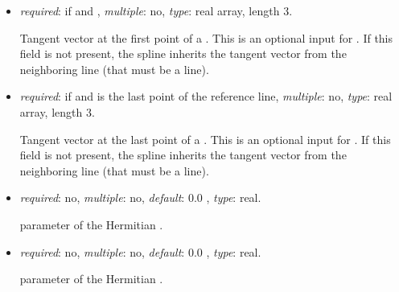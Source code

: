 \begin{itemize}
\item {} \textit{required}: if  
and , \textit{multiple}: no, 
\textit{type}: real array, length 3. 

    Tangent vector at the first point of a . 
    This is an optional input for . If this field 
    is not present, the spline inherits the tangent vector from the 
    neighboring line (that must be a  line).

\item {} \textit{required}: if  
and  is the last point of the reference line, 
\textit{multiple}: no, \textit{type}: real array, length 3. 

    Tangent vector at the last point of a . 
    This is an optional input for . If this field is 
    not present, the spline inherits the tangent vector from the 
    neighboring line (that must be a  line).

\item {} \textit{required}: no, \textit{multiple}: no, 
\textit{default}: 0.0 , \textit{type}: real.

     parameter of the Hermitian .

\item {} \textit{required}: no, \textit{multiple}: no, 
\textit{default}: 0.0 , \textit{type}: real.

     parameter of the Hermitian .

\end{itemize}

